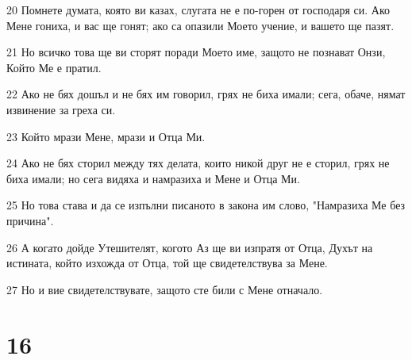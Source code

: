 \par 20 Помнете думата, която ви казах, слугата не е по-горен от господаря си. Ако Мене гониха, и вас ще гонят; ако са опазили Моето учение, и вашето ще пазят.
\par 21 Но всичко това ще ви сторят поради Моето име, защото не познават Онзи, Който Ме е пратил.
\par 22 Ако не бях дошъл и не бях им говорил, грях не биха имали; сега, обаче, нямат извинение за греха си.
\par 23 Който мрази Мене, мрази и Отца Ми.
\par 24 Ако не бях сторил между тях делата, които никой друг не е сторил, грях не биха имали; но сега видяха и намразиха и Мене и Отца Ми.
\par 25 Но това става и да се изпълни писаното в закона им слово, "Намразиха Ме без причина".
\par 26 А когато дойде Утешителят, когото Аз ще ви изпратя от Отца, Духът на истината, който изхожда от Отца, той ще свидетелствува за Мене.
\par 27 Но и вие свидетелствувате, защото сте били с Мене отначало.

\chapter{16}

